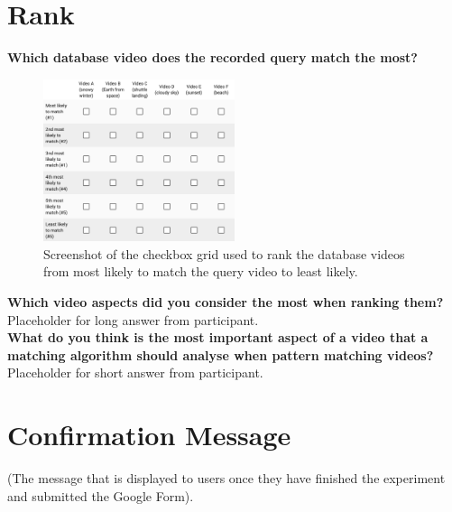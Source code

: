 \section{Rank}

\textbf{Which database video does the recorded query match the most?}\\

\begin{figure}[h] 
\centerline{\includegraphics[width=0.5\textwidth]{figures/appendix/survey_video_ranking.png}}
\caption{\label{fig:appendix_survey_video_ranking}Screenshot of the checkbox grid used to rank the database videos from most likely to match the query video to least likely.}
\end{figure}

\textbf{Which video aspects did you consider the most when ranking them?}\\

Placeholder for long answer from participant.\\

\textbf{What do you think is the most important aspect of a video that a matching algorithm should analyse when pattern matching videos?}\\

Placeholder for short answer from participant.

\section{Confirmation Message}

(The message that is displayed to users once they have finished the experiment and submitted the Google Form).\\

